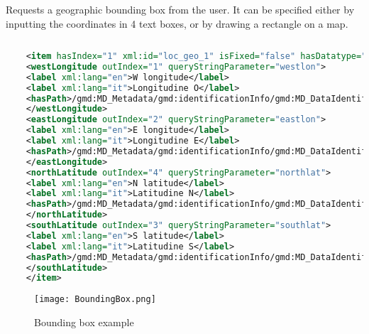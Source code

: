 Requests a geographic bounding box from the user.
It can be specified either by inputting the coordinates in 4 text boxes, or by drawing a rectangle on a map.

\begin{lstlisting}[language=xml]
	
	<item hasIndex="1" xml:id="loc_geo_1" isFixed="false" hasDatatype="boundingBox">
	<westLongitude outIndex="1" queryStringParameter="westlon">
	<label xml:lang="en">W longitude</label>
	<label xml:lang="it">Longitudine O</label>
	<hasPath>/gmd:MD_Metadata/gmd:identificationInfo/gmd:MD_DataIdentification/gmd:extent/gmd:EX_Extent/gmd:geographicElement/gmd:EX_GeographicBoundingBox/gmd:westBoundLongitude/gco:Decimal</hasPath>
	</westLongitude>
	<eastLongitude outIndex="2" queryStringParameter="eastlon">
	<label xml:lang="en">E longitude</label>
	<label xml:lang="it">Longitudine E</label>
	<hasPath>/gmd:MD_Metadata/gmd:identificationInfo/gmd:MD_DataIdentification/gmd:extent/gmd:EX_Extent/gmd:geographicElement/gmd:EX_GeographicBoundingBox/gmd:eastBoundLongitude/gco:Decimal</hasPath>
	</eastLongitude>
	<northLatitude outIndex="4" queryStringParameter="northlat">
	<label xml:lang="en">N latitude</label>
	<label xml:lang="it">Latitudine N</label>
	<hasPath>/gmd:MD_Metadata/gmd:identificationInfo/gmd:MD_DataIdentification/gmd:extent/gmd:EX_Extent/gmd:geographicElement/gmd:EX_GeographicBoundingBox/gmd:northBoundLatitude/gco:Decimal</hasPath>
	</northLatitude>
	<southLatitude outIndex="3" queryStringParameter="southlat">
	<label xml:lang="en">S latitude</label>
	<label xml:lang="it">Latitudine S</label>
	<hasPath>/gmd:MD_Metadata/gmd:identificationInfo/gmd:MD_DataIdentification/gmd:extent/gmd:EX_Extent/gmd:geographicElement/gmd:EX_GeographicBoundingBox/gmd:southBoundLatitude/gco:Decimal</hasPath>
	</southLatitude>
	</item>	
\end{lstlisting}

\begin{figure}[h]
	\caption{Bounding box example}
	\texttt{[image: BoundingBox.png]}
	\centering
\end{figure}	
